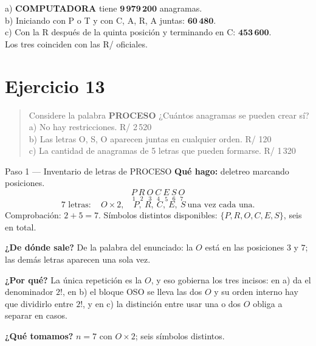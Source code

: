 \documentclass[11pt]{article}
\begin{document}
\begin{resp}
a) \textbf{COMPUTADORA} tiene $\mathbf{9\,979\,200}$ anagramas.\\
b) Iniciando con P o T y con C, A, R, A juntas: $\mathbf{60\,480}$.\\
c) Con la R después de la quinta posición y terminando en C: $\mathbf{453\,600}$.\\
Los tres coinciden con las R/ oficiales.
\end{resp}

\section*{Ejercicio 13}

\begin{quote}
Considere la palabra \textbf{PROCESO} ¿Cuántos anagramas se pueden crear sí?\\
a) No hay restricciones. \hfill R/ 2\,520\\
b) Las letras O, S, O aparecen juntas en cualquier orden. \hfill R/ 120\\
c) La cantidad de anagramas de 5 letras que pueden formarse. \hfill R/ 1\,320
\end{quote}

\begin{paso}{Paso 1 --- Inventario de letras de PROCESO}
\textbf{Qué hago:} deletreo marcando posiciones.
\[
\underset{1}{P}\ \underset{2}{R}\ \underset{3}{O}\ \underset{4}{C}\ \underset{5}{E}\ \underset{6}{S}\
\underset{7}{O}
\]
\[
7 \text{ letras}:\quad O\times 2,\quad P,\ R,\ C,\ E,\ S \ \text{una vez cada una}.
\]
Comprobación: $2+5=7$. \checkmark \; Símbolos distintos disponibles: $\{P,R,O,C,E,S\}$, seis en total.

\textbf{¿De dónde sale?} De la palabra del enunciado: la $O$ está en las posiciones $3$ y $7$; las demás
letras aparecen una sola vez.

\textbf{¿Por qué?} La única repetición es la $O$, y eso gobierna los tres incisos: en a) da el denominador
$2!$, en b) el bloque OSO se lleva las dos $O$ y su orden interno hay que dividirlo entre $2!$, y en c) la
distinción entre usar una o dos $O$ obliga a separar en casos.

\textbf{¿Qué tomamos?} $n=7$ con $O\times2$; seis símbolos distintos.
\end{paso}
\end{document}

